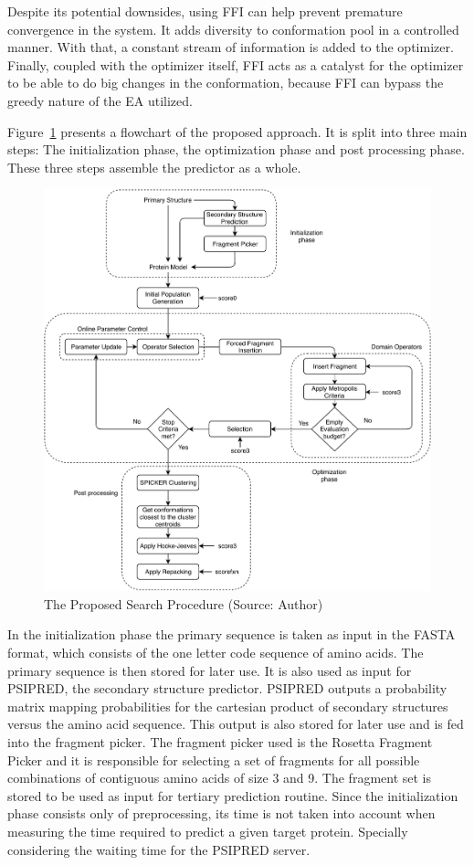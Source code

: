 Despite its potential downsides, using \ac{FFI} can help prevent premature
convergence in the system. It adds diversity to conformation pool in a controlled
manner. With that, a constant stream of information is added to the optimizer.
Finally, coupled with the optimizer itself, \ac{FFI} acts as a catalyst for the
optimizer to be able to do big changes in the conformation, because \ac{FFI} can
bypass the greedy nature of the \ac{EA} utilized.

Figure~\ref{fig:search-procedure} presents a flowchart of the proposed
approach. It is split into three main steps: The initialization phase, the
optimization phase and post processing phase. These three steps assemble the
predictor as a whole.

\begin{figure}
    \centering
    \includegraphics[width=\linewidth]{Figuras/search-procedure.pdf}
    \caption{The Proposed Search Procedure (Source: Author)}
    \label{fig:search-procedure}
\end{figure}

In the initialization phase the primary sequence is taken as input in the FASTA
format, which consists of the one letter code sequence of amino acids. The
primary sequence is then stored for later use. It is also used as input for
PSIPRED, the secondary structure predictor. PSIPRED outputs a probability
matrix mapping probabilities for the cartesian product of secondary structures
versus the amino acid sequence. This output is also stored for later use and is
fed into the fragment picker.  The fragment picker used is the Rosetta Fragment
Picker and it is responsible for selecting a set of fragments for all possible
combinations of contiguous amino acids of size 3 and 9. The fragment set is
stored to be used as input for tertiary prediction routine. Since the
initialization phase consists only of preprocessing, its time is not taken into
account when measuring the time required to predict a given target protein.
Specially considering the waiting time for the PSIPRED server.

